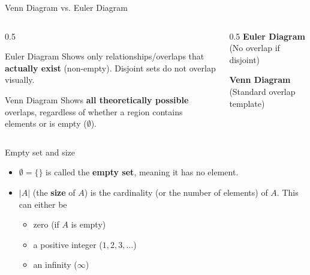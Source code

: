\begin{frame}{Venn Diagram vs. Euler Diagram}
\begin{columns}
\begin{column}{0.5\textwidth}
\begin{block}{Euler Diagram}
Shows only relationships/overlaps that \textbf{actually exist} (non-empty). Disjoint sets do not overlap visually.
\end{block}
\begin{block}{Venn Diagram}
Shows \textbf{all theoretically possible} overlaps, regardless of whether a region contains elements or is empty ($\emptyset$).
\end{block}
\end{column}
\begin{column}{0.5\textwidth}
\centering
\textbf{Euler Diagram} (No overlap if disjoint)\\

\vspace{0.3cm}
\textbf{Venn Diagram} (Standard overlap template)\\
\end{column}
\end{columns}
\end{frame}

\begin{frame}{}
\end{frame}

\begin{frame}{Empty set and size}
\begin{defn}{}{}
\begin{itemize}
\item $\emptyset = \{\}$ is called the \textbf{empty set}, meaning it has no element. 
\item $|A|$ (the \textbf{size} of $A$) is the cardinality (or the number of elements) of $A$. This can either be \begin{itemize}
\item zero (if $A$ is empty)
\item a positive integer ($1,2,3,\ldots$)
\item an infinity ($\infty$)
\end{itemize}
\end{itemize}
\end{defn}
\end{frame}

